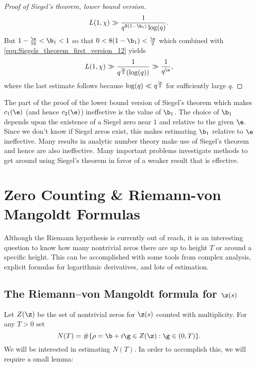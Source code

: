 \begin{proof}[Proof of Siegel's theorem, lower bound version]
        \begin{equation}\label{equ:Siegels_theorem_first_version_12}
          L(1,\chi) \gg \frac{1}{q^{8(1-\b_{1})}\log(q)}.
        \end{equation}
        But $1-\frac{\e}{16} < \b_{1} < 1$ so that $0 < 8(1-\b_{1}) < \frac{\e}{2}$ which combined with \cref{equ:Siegels_theorem_first_version_12} yields
        \[
          L(1,\chi) \gg \frac{1}{q^{\frac{\e}{2}}(\log(q))} \gg \frac{1}{q^{\e}},
        \]
        where the last estimate follows because $\log(q) \ll q^{\frac{\e}{2}}$ for sufficiently large $q$.
      \end{proof}

      The part of the proof of the lower bound version of Siegel's theorem which makes $c_{1}(\e)$ (and hence $c_{2}(\e)$) ineffective is the value of $\b_{1}$. The choice of $\b_{1}$ depends upon the existence of a Siegel zero near $1$ and relative to the given $\e$. Since we don't know if Siegel zeros exist, this makes estimating $\b_{1}$ relative to $\e$ ineffective. Many results in analytic number theory make use of Siegel's theorem and hence are also ineffective. Many important problems investigate methods to get around using Siegel's theorem in favor of a weaker result that is effective.
  \section{Zero Counting \& Riemann-von Mangoldt Formulas}
    Although the Riemann hypothesis is currently out of reach, it is an interesting question to know how many nontrivial zeros there are up to height $T$ or around a specific height. This can be accomplished with some tools from complex analysis, explicit formulas for logarithmic derivatives, and lots of estimation.
    \subsection*{The Riemann–von Mangoldt formula for $\z(s)$}
      Let $Z(\z)$ be the set of nontrivial zeros for $\z(s)$ counted with multiplicity. For any $T > 0$ set
      \[
        N(T) = \#\{\rho = \b+i\g \in Z(\z): \g \in (0,T)\}.
      \]
      We will be interested in estimating $N(T)$. In order to accomplish this, we will require a small lemma:

